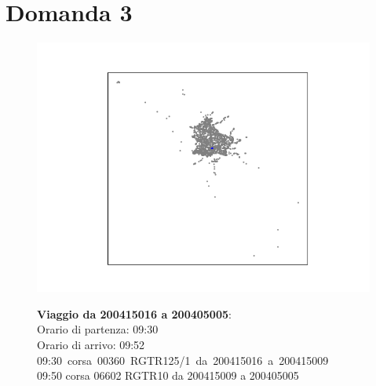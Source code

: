 \documentclass{article}
\begin{document}
\section*{Domanda 3}
\begin{figure}[H]
	\begin{minipage}{0.55\linewidth}
		\centering
		\hspace*{-3cm}\includegraphics[width=1.0\linewidth, valign=t]{figures/200415016_200405005}
	\end{minipage}
	\hspace*{-2cm}\begin{minipage}{0.7\linewidth}
		\textbf{Viaggio da 200415016 a 200405005}:\\
		Orario di partenza: 09:30\\
		Orario di arrivo: 09:52\\
		\mbox{09:30 corsa 00360 RGTR125/1 da 200415016 a 200415009}\\
		09:50 corsa 06602 RGTR10 da 200415009 a 200405005
			\end{minipage}
\end{figure}
\end{document}
